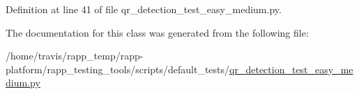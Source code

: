 Definition at line 41 of file qr\-\_\-detection\-\_\-test\-\_\-easy\-\_\-medium.\-py.



The documentation for this class was generated from the following file\-:\begin{DoxyCompactItemize}
\item 
/home/travis/rapp\-\_\-temp/rapp-\/platform/rapp\-\_\-testing\-\_\-tools/scripts/default\-\_\-tests/\hyperlink{qr__detection__test__easy__medium_8py}{qr\-\_\-detection\-\_\-test\-\_\-easy\-\_\-medium.\-py}\end{DoxyCompactItemize}
